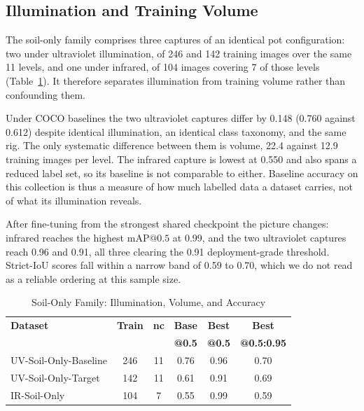 ﻿\documentclass[journal]{IEEEtran}
\begin{document}
\subsection{Illumination and Training Volume}
The soil-only family comprises three captures of an identical pot configuration: two under ultraviolet illumination, of 246 and 142 training images over the same 11 levels, and one under infrared, of 104 images covering 7 of those levels (Table~\ref{tab:modality}). It therefore separates illumination from training volume rather than confounding them.

Under COCO baselines the two ultraviolet captures differ by 0.148 (0.760 against 0.612) despite identical illumination, an identical class taxonomy, and the same rig. The only systematic difference between them is volume, 22.4 against 12.9 training images per level. The infrared capture is lowest at 0.550 and also spans a reduced label set, so its baseline is not comparable to either. Baseline accuracy on this collection is thus a measure of how much labelled data a dataset carries, not of what its illumination reveals.

After fine-tuning from the strongest shared checkpoint the picture changes: infrared reaches the highest $\text{mAP@0.5}$ at 0.99, and the two ultraviolet captures reach 0.96 and 0.91, all three clearing the 0.91 deployment-grade threshold. Strict-IoU scores fall within a narrow band of 0.59 to 0.70, which we do not read as a reliable ordering at this sample size.

\begin{table}[!t]
\renewcommand{\arraystretch}{1.3}
\caption{Soil-Only Family: Illumination, Volume, and Accuracy}
\label{tab:modality}
\centering
\footnotesize
\setlength{\tabcolsep}{3.5pt}
\begin{tabular}{l c c c c c}
\toprule
\textbf{Dataset} & \textbf{Train} & \textbf{nc} & \textbf{Base} & \textbf{Best} & \textbf{Best} \\
 & & & \textbf{@0.5} & \textbf{@0.5} & \textbf{@0.5:0.95} \\
\midrule
UV-Soil-Only-Baseline & 246 & 11 & 0.76 & 0.96 & 0.70 \\
UV-Soil-Only-Target & 142 & 11 & 0.61 & 0.91 & 0.69 \\
IR-Soil-Only & 104 & 7 & 0.55 & 0.99 & 0.59 \\
\bottomrule
\end{tabular}
\end{table}
\end{document}
